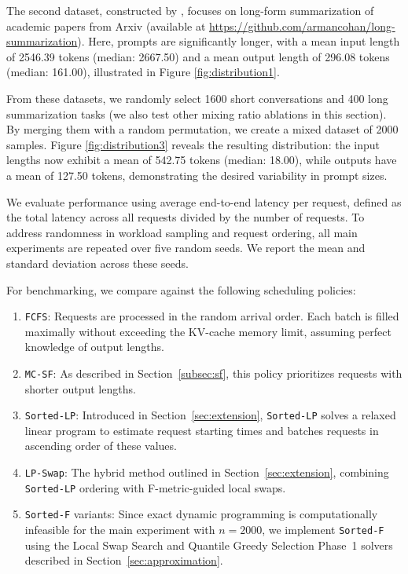 \documentclass[nonblindrev]{informs3_hide}
\newcommand{\xhdr}[1]{\vspace{1mm} \noindent{\bf #1}}
\newcommand{\mcsdf}{\texttt{MC-SF}}
\newcommand{\sortF}{\texttt{Sorted-F}}
\newcommand{\sortLP}{\texttt{Sorted-LP}}
\newcommand{\LPSwap}{\texttt{LP-Swap}}
\begin{document}
The second dataset, constructed by \cite{cohan2018discourse}, focuses on long-form summarization of academic papers from Arxiv (available at \url{https://github.com/armancohan/long-summarization}). Here, prompts are significantly longer, with a mean input length of 2546.39 tokens (median: 2667.50) and a mean output length of 296.08 tokens (median: 161.00), illustrated in Figure \ref{fig:distribution1}.  

 

From these datasets, we randomly select 1600 short conversations and 400 long summarization tasks (we also test other mixing ratio ablations in this section). By merging them with a random permutation, we create a mixed dataset of 2000 samples. Figure \ref{fig:distribution3} reveals the resulting distribution: the input lengths now exhibit a mean of 542.75 tokens (median: 18.00), while outputs have a mean of 127.50 tokens, demonstrating the desired variability in prompt sizes.  

\xhdr{Experiment Setup. }
We evaluate performance using average end-to-end latency per request, defined as the total latency across all requests divided by the number of requests. To address randomness in workload sampling and request ordering, all main experiments are repeated over five random seeds. We report the mean and standard deviation across these seeds.

For benchmarking, we compare against the following scheduling policies:
\begin{enumerate}
    \item \texttt{FCFS}: Requests are processed in the random arrival order. Each batch is filled maximally without exceeding the KV-cache memory limit, assuming perfect knowledge of output lengths.
    \item \mcsdf{}: As described in Section~\ref{subsec:sf}, this policy prioritizes requests with shorter output lengths.
    \item \sortLP{}: Introduced in Section~\ref{sec:extension}, \sortLP{} solves a relaxed linear program to estimate request starting times and batches requests in ascending order of these values.
    \item \LPSwap{}: The hybrid method outlined in Section~\ref{sec:extension}, combining \sortLP{} ordering with F-metric-guided local swaps.
    \item \sortF{} variants: Since exact dynamic programming is computationally infeasible for the main experiment with \(n=2000\), we implement \sortF{} using the Local Swap Search and Quantile Greedy Selection Phase~1 solvers described in Section~\ref{sec:approximation}.
\end{enumerate}
\end{document}
